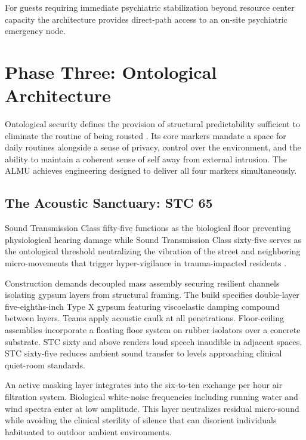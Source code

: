 \documentclass[12pt, letterpaper]{article}
\begin{document}
For guests requiring immediate psychiatric stabilization beyond resource center capacity the architecture provides direct-path access to an on-site psychiatric emergency node.

\clearpage

\section{Phase Three: Ontological Architecture}

Ontological security defines the provision of structural predictability sufficient to eliminate the routine of being rousted \citep{giddens_1991, laing_1960}. Its core markers mandate a space for daily routines alongside a sense of privacy, control over the environment, and the ability to maintain a coherent sense of self away from external intrusion. The ALMU achieves engineering designed to deliver all four markers simultaneously.

\subsection{The Acoustic Sanctuary: STC 65}

Sound Transmission Class fifty-five functions as the biological floor preventing physiological hearing damage while Sound Transmission Class sixty-five serves as the ontological threshold neutralizing the vibration of the street and neighboring micro-movements that trigger hyper-vigilance in trauma-impacted residents \citep{frontiers_acoustic_2024, gb_acoustics_2024}.

Construction demands decoupled mass assembly securing resilient channels isolating gypsum layers from structural framing. The build specifies double-layer five-eighths-inch Type X gypsum featuring viscoelastic damping compound between layers. Teams apply acoustic caulk at all penetrations. Floor-ceiling assemblies incorporate a floating floor system on rubber isolators over a concrete substrate. STC sixty and above renders loud speech inaudible in adjacent spaces. STC sixty-five reduces ambient sound transfer to levels approaching clinical quiet-room standards.

An active masking layer integrates into the six-to-ten exchange per hour air filtration system. Biological white-noise frequencies including running water and wind spectra enter at low amplitude. This layer neutralizes residual micro-sound while avoiding the clinical sterility of silence that can disorient individuals habituated to outdoor ambient environments.
\end{document}
